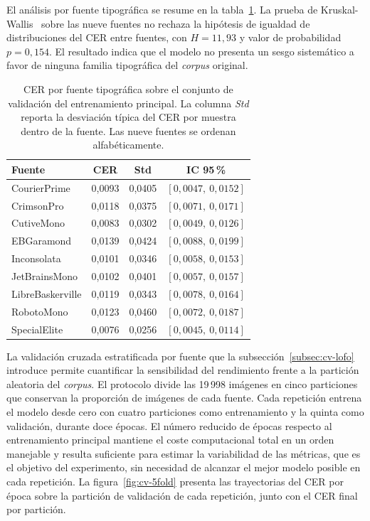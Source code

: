 El análisis por fuente tipográfica se resume en la tabla~\ref{tab:cer-por-fuente-principal}. La prueba de Kruskal-Wallis~\cite{kruskal1952ranks} sobre las nueve fuentes no rechaza la hipótesis de igualdad de distribuciones del CER entre fuentes, con $H = 11{,}93$ y valor de probabilidad $p = 0{,}154$. El resultado indica que el modelo no presenta un sesgo sistemático a favor de ninguna familia tipográfica del \textit{corpus} original.

\begin{table}[!htbp]
	\centering
	\caption{CER por fuente tipográfica sobre el conjunto de validación del entrenamiento principal. La columna \emph{Std} reporta la desviación típica del CER por muestra dentro de la fuente. Las nueve fuentes se ordenan alfabéticamente.}
	\label{tab:cer-por-fuente-principal}
	\begin{tabular}{lccc}
		\toprule
		\textbf{Fuente} & \textbf{CER} & \textbf{Std} & \textbf{IC 95\,\%} \\
		\midrule
		CourierPrime      & 0,0093 & 0,0405 & $[0{,}0047,\ 0{,}0152]$ \\
		CrimsonPro        & 0,0118 & 0,0375 & $[0{,}0071,\ 0{,}0171]$ \\
		CutiveMono        & 0,0083 & 0,0302 & $[0{,}0049,\ 0{,}0126]$ \\
		EBGaramond        & 0,0139 & 0,0424 & $[0{,}0088,\ 0{,}0199]$ \\
		Inconsolata       & 0,0101 & 0,0346 & $[0{,}0058,\ 0{,}0153]$ \\
		JetBrainsMono     & 0,0102 & 0,0401 & $[0{,}0057,\ 0{,}0157]$ \\
		LibreBaskerville  & 0,0119 & 0,0343 & $[0{,}0078,\ 0{,}0164]$ \\
		RobotoMono        & 0,0123 & 0,0460 & $[0{,}0072,\ 0{,}0187]$ \\
		SpecialElite      & 0,0076 & 0,0256 & $[0{,}0045,\ 0{,}0114]$ \\
		\bottomrule
	\end{tabular}
\end{table}

La validación cruzada estratificada por fuente que la subsección~\ref{subsec:cv-lofo} introduce permite cuantificar la sensibilidad del rendimiento frente a la partición aleatoria del \textit{corpus}. El protocolo divide las 19\,998 imágenes en cinco particiones que conservan la proporción de imágenes de cada fuente. Cada repetición entrena el modelo desde cero con cuatro particiones como entrenamiento y la quinta como validación, durante doce épocas. El número reducido de épocas respecto al entrenamiento principal mantiene el coste computacional total en un orden manejable y resulta suficiente para estimar la variabilidad de las métricas, que es el objetivo del experimento, sin necesidad de alcanzar el mejor modelo posible en cada repetición. La figura~\ref{fig:cv-5fold} presenta las trayectorias del CER por época sobre la partición de validación de cada repetición, junto con el CER final por partición.

